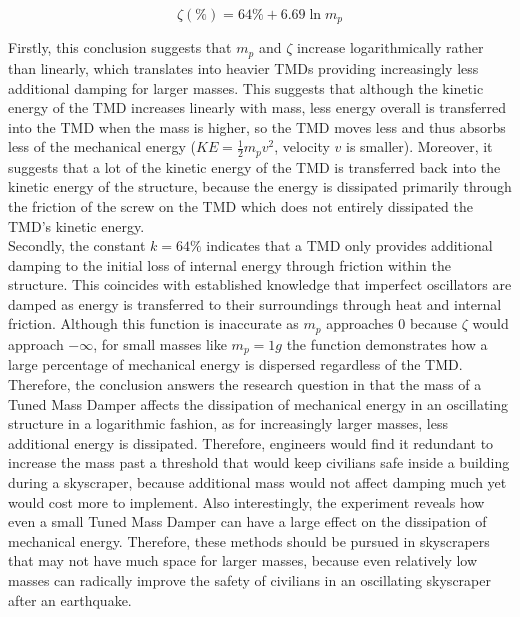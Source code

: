 \documentclass[11pt]{article}
\begin{document}
$$\zeta (\%) = 64\% + 6.69\ln m_p$$

Firstly, this conclusion suggests that $m_p$ and $\zeta$ increase logarithmically rather than linearly, which translates into heavier TMDs providing increasingly less additional damping for larger masses. This suggests that although the kinetic energy of the TMD increases linearly with mass, less energy overall is transferred into the TMD when the mass is higher, so the TMD moves less and thus absorbs less of the mechanical energy ($KE=\frac{1}{2}m_pv^2$, velocity $v$ is smaller). Moreover, it suggests that a lot of the kinetic energy of the TMD is transferred back into the kinetic energy of the structure, because the energy is dissipated primarily through the friction of the screw on the TMD which does not entirely dissipated the TMD's kinetic energy. \\


Secondly, the constant $k=64\%$ indicates that a TMD only provides additional damping to the initial loss of internal energy through friction within the structure. This coincides with established knowledge that imperfect oscillators are damped as energy is transferred to their surroundings through heat and internal friction. Although this function is inaccurate as $m_p$ approaches 0 because $\zeta$ would approach $-\infty$, for small masses like $m_p = 1g$ the function demonstrates how a large percentage of mechanical energy is dispersed regardless of the TMD. \\


Therefore, the conclusion answers the research question in that the mass of a Tuned Mass Damper affects the dissipation of mechanical energy in an oscillating structure in a logarithmic fashion, as for increasingly larger masses, less additional energy is dissipated. Therefore, engineers would find it redundant to increase the mass past a threshold that would keep civilians safe inside a building during a skyscraper, because additional mass would not affect damping much yet would cost more to implement. Also interestingly, the experiment reveals how even a small Tuned Mass Damper can have a large effect on the dissipation of mechanical energy. Therefore, these methods should be pursued in skyscrapers that may not have much space for larger masses, because even relatively low masses can radically improve the safety of civilians in an oscillating skyscraper after an earthquake.

\end{document}
